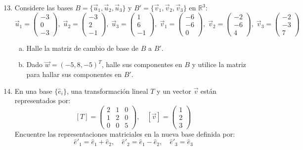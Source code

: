 \documentclass[12pt,a4paper]{article}
\begin{document}
\begin{enumerate}[1.]
\setcounter{enumi}{12}
\item Considere las bases $B=\{\vec{u}_1,\vec{u}_2,\vec{u}_3\}$ y $B'=\{\vec{v}_1,\vec{v}_2,\vec{v}_3\}$ en $\mathbb{R}^3$:
\[
\vec{u}_1=\begin{pmatrix}-3 \\ 0 \\ -3\end{pmatrix},\;
\vec{u}_2=\begin{pmatrix}-3 \\ 2 \\ -1\end{pmatrix},\;
\vec{u}_3=\begin{pmatrix}1 \\ 6 \\ -1\end{pmatrix},\;
\vec{v}_1=\begin{pmatrix}-6 \\ -6 \\ 0\end{pmatrix},\;
\vec{v}_2=\begin{pmatrix}-2 \\ -6 \\ 4\end{pmatrix},\;
\vec{v}_3=\begin{pmatrix}-2 \\ -3 \\ 7\end{pmatrix}
\]
\begin{enumerate}[a)]
\item Halle la matriz de cambio de base de $B$ a $B'$.
\item Dado $\vec{w}=(-5,8,-5)^T$, halle sus componentes en $B$ y utilice la matriz para hallar sus componentes en $B'$.
\end{enumerate}

\item En una base $\{\hat{e}_i\}$, una transformación lineal $T$ y un vector $\vec{v}$ están representados por:
\[
[T]=\begin{pmatrix}2 & 1 & 0 \\ 1 & 2 & 0 \\ 0 & 0 & 5\end{pmatrix},\quad
[\vec{v}]=\begin{pmatrix}1 \\ 2 \\ 3\end{pmatrix}
\]
Encuentre las representaciones matriciales en la nueva base definida por:
\[
\hat{e}'_1=\hat{e}_1+\hat{e}_2,\quad
\hat{e}'_2=\hat{e}_1-\hat{e}_2,\quad
\hat{e}'_3=\hat{e}_3
\]


\end{enumerate}
\end{document}
